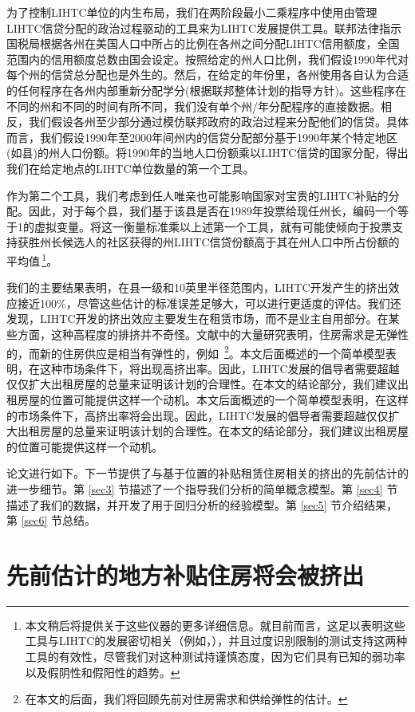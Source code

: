 \documentclass[lang=cn,11pt,a4paper]{paper}
\begin{document}
为了控制LIHTC单位的内生布局，我们在两阶段最小二乘程序中使用由管理LIHTC信贷分配的政治过程驱动的工具来为LIHTC发展提供工具。联邦法律指示国税局根据各州在美国人口中所占的比例在各州之间分配LIHTC信用额度，全国范围内的信用额度总数由国会设定。按照给定的州人口比例，我们假设1990年代对每个州的信贷总分配也是外生的。然后，在给定的年份里，各州使用各自认为合适的任何程序在各州内部重新分配学分(根据联邦整体计划的指导方针)。这些程序在不同的州和不同的时间有所不同，我们没有单个州/年分配程序的直接数据。相反，我们假设各州至少部分通过模仿联邦政府的政治过程来分配他们的信贷。具体而言，我们假设1990年至2000年间州内的信贷分配部分基于1990年某个特定地区(如县)的州人口份额。将1990年的当地人口份额乘以LIHTC信贷的国家分配，得出我们在给定地点的LIHTC单位数量的第一个工具。

作为第二个工具，我们考虑到任人唯亲也可能影响国家对宝贵的LIHTC补贴的分配。因此，对于每个县，我们基于该县是否在1989年投票给现任州长，编码一个等于1的虚拟变量。将这一衡量标准乘以上述第一个工具，就有可能使倾向于投票支持获胜州长候选人的社区获得的州LIHTC信贷份额高于其在州人口中所占份额的平均值\,\footnote{本文稍后将提供关于这些仪器的更多详细信息。就目前而言，这足以表明这些工具与LIHTC的发展密切相关（例如，\citep{Stock200580,Murray2006111}），并且过度识别限制的测试支持这两种工具的有效性，尽管我们对这种测试持谨慎态度，因为它们具有已知的弱功率以及假阴性和假阳性的趋势。}。

我们的主要结果表明，在县一级和10英里半径范围内，LIHTC开发产生的挤出效应接近100\%，尽管这些估计的标准误差足够大，可以进行更适度的评估。我们还发现，LIHTC开发的挤出效应主要发生在租赁市场，而不是业主自用部分。在某些方面，这种高程度的排挤并不奇怪。文献中的大量研究表明，住房需求是无弹性的，而新的住房供应是相当有弹性的，例如 \citep{Hanushek1980449}\,\footnote{在本文的后面，我们将回顾先前对住房需求和供给弹性的估计。}。本文后面概述的一个简单模型表明，在这种市场条件下，将出现高挤出率。因此，LIHTC发展的倡导者需要超越仅仅扩大出租房屋的总量来证明该计划的合理性。在本文的结论部分，我们建议出租房屋的位置可能提供这样一个动机。本文后面概述的一个简单模型表明，在这样的市场条件下，高挤出率将会出现。因此，LIHTC发展的倡导者需要超越仅仅扩大出租房屋的总量来证明该计划的合理性。在本文的结论部分，我们建议出租房屋的位置可能提供这样一个动机。

论文进行如下。下一节提供了与基于位置的补贴租赁住房相关的挤出的先前估计的进一步细节。第 \ref{sec3} 节描述了一个指导我们分析的简单概念模型。第 \ref{sec4} 节描述了我们的数据，并开发了用于回归分析的经验模型。第 \ref{sec5} 节介绍结果，第 \ref{sec6} 节总结。

\section{先前估计的地方补贴住房将会被挤出}
\end{document}
